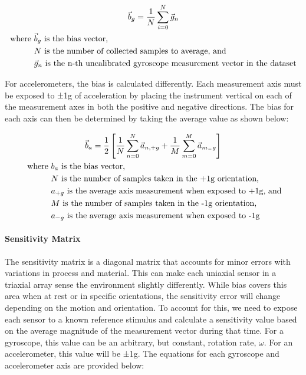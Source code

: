 \begin{gather} \label{eq:gyroscope_bias}
    \vec{b}_g = \frac{1}{N} \sum_{i=0}^N{\vec{g}_n} \\
    \begin{aligned}
        \text{where } & \vec{b}_g \text{ is the bias vector,} \\
        & N \text{ is the number of collected samples to average, and} \\
        & \vec{g}_n \text{ is the n-th uncalibrated gyroscope measurement vector in the dataset}
    \end{aligned} \notag
\end{gather}

For accelerometers, the bias is calculated differently. Each measurement axis must be exposed to ±1g of acceleration by placing the instrument vertical on each of the measurement axes in both the positive and negative directions. The bias for each axis can then be determined by taking the average value as shown below:

\begin{gather} \label{eq:accelerometer_bias}
    \vec{b}_a = \frac{1}{2} \left[ \frac{1}{N}\sum_{n=0}^N{\vec{a}_{n,+g}} + \frac{1}{M}\sum_{m=0}^M{\vec{a}_{m_-g}} \right] \\\
    \begin{aligned}
        \text{where } & b_a \text{ is the bias vector,} \\
        & N \text{ is the number of samples taken in the +1g orientation,} \\
        & a_{+g} \text{ is the average axis measurement when exposed to +1g, and}\\
        & M \text{ is the number of samples taken in the -1g orientation,} \\
        & a_{-g} \text{ is the average axis measurement when exposed to -1g}
    \end{aligned} \notag
\end{gather}

\paragraph*{Sensitivity Matrix} The sensitivity matrix is a diagonal matrix that accounts for minor errors with variations in process and material. 
This can make each uniaxial sensor in a triaxial array sense the environment slightly differently. 
While bias covers this area when at rest or in specific orientations, the sensitivity error will change depending on the motion and orientation. 
To account for this, we need to expose each sensor to a known reference stimulus and calculate a sensitivity value based on the average magnitude of the measurement vector during that time. 
For a gyroscope, this value can be an arbitrary, but constant, rotation rate, $\omega$. 
For an accelerometer, this value will be ±1g. The equations for each gyroscope and accelerometer axis are provided below:

